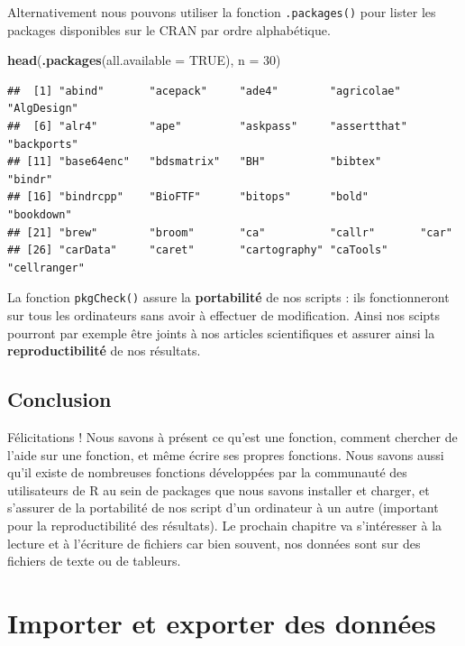 \documentclass[]{book}
\newenvironment{Shaded}{\begin{snugshade}}{\end{snugshade}}
\newcommand{\DataTypeTok}[1]{\textcolor[rgb]{0.13,0.29,0.53}{#1}}
\newcommand{\DecValTok}[1]{\textcolor[rgb]{0.00,0.00,0.81}{#1}}
\newcommand{\KeywordTok}[1]{\textcolor[rgb]{0.13,0.29,0.53}{\textbf{#1}}}
\newcommand{\NormalTok}[1]{#1}
\newcommand{\OtherTok}[1]{\textcolor[rgb]{0.56,0.35,0.01}{#1}}
\begin{document}
Alternativement nous pouvons utiliser la fonction \texttt{.packages()} pour lister les packages disponibles sur le CRAN par ordre alphabétique.

\begin{Shaded}
\begin{Highlighting}[]
\KeywordTok{head}\NormalTok{(}\KeywordTok{.packages}\NormalTok{(}\DataTypeTok{all.available =} \OtherTok{TRUE}\NormalTok{), }\DataTypeTok{n =} \DecValTok{30}\NormalTok{)}
\end{Highlighting}
\end{Shaded}

\begin{verbatim}
##  [1] "abind"       "acepack"     "ade4"        "agricolae"   "AlgDesign"  
##  [6] "alr4"        "ape"         "askpass"     "assertthat"  "backports"  
## [11] "base64enc"   "bdsmatrix"   "BH"          "bibtex"      "bindr"      
## [16] "bindrcpp"    "BioFTF"      "bitops"      "bold"        "bookdown"   
## [21] "brew"        "broom"       "ca"          "callr"       "car"        
## [26] "carData"     "caret"       "cartography" "caTools"     "cellranger"
\end{verbatim}

La fonction \texttt{pkgCheck()} assure la \textbf{portabilité} de nos scripts : ils fonctionneront sur tous les ordinateurs sans avoir à effectuer de modification. Ainsi nos scipts pourront par exemple être joints à nos articles scientifiques et assurer ainsi la \textbf{reproductibilité} de nos résultats.

\hypertarget{conclusion-4}{%
\section{Conclusion}\label{conclusion-4}}

Félicitations ! Nous savons à présent ce qu'est une fonction, comment chercher de l'aide sur une fonction, et même écrire ses propres fonctions. Nous savons aussi qu'il existe de nombreuses fonctions développées par la communauté des utilisateurs de R au sein de packages que nous savons installer et charger, et s'assurer de la portabilité de nos script d'un ordinateur à un autre (important pour la reproductibilité des résultats). Le prochain chapitre va s'intéresser à la lecture et à l'écriture de fichiers car bien souvent, nos données sont sur des fichiers de texte ou de tableurs.

\hypertarget{import}{%
\chapter{Importer et exporter des données}\label{import}}
\end{document}
